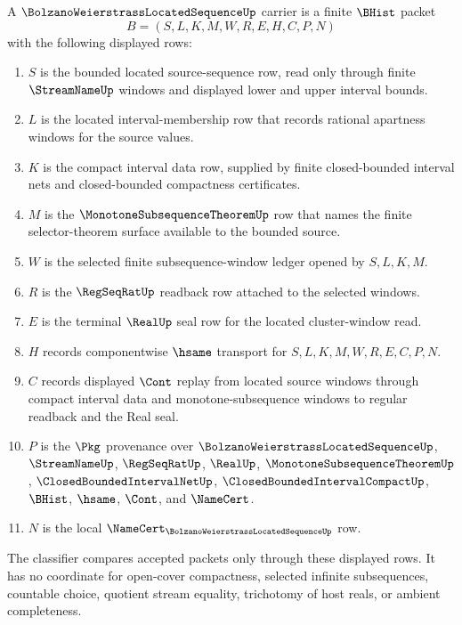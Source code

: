 \begin{definition}
\label{def:bolzano-weierstrass-located-sequence-carrier}
A $\BolzanoWeierstrassLocatedSequenceUp$ carrier is a finite $\BHist$ packet
$$
B=(S,L,K,M,W,R,E,H,C,P,N)
$$
with the following displayed rows:
\begin{enumerate}
\item $S$ is the bounded located source-sequence row, read only through finite $\StreamNameUp$ windows and displayed lower and upper interval bounds.
\item $L$ is the located interval-membership row that records rational apartness windows for the source values.
\item $K$ is the compact interval data row, supplied by finite closed-bounded interval nets and closed-bounded compactness certificates.
\item $M$ is the $\MonotoneSubsequenceTheoremUp$ row that names the finite selector-theorem surface available to the bounded source.
\item $W$ is the selected finite subsequence-window ledger opened by $S,L,K,M$.
\item $R$ is the $\RegSeqRatUp$ readback row attached to the selected windows.
\item $E$ is the terminal $\RealUp$ seal row for the located cluster-window read.
\item $H$ records componentwise $\hsame$ transport for $S,L,K,M,W,R,E,C,P,N$.
\item $C$ records displayed $\Cont$ replay from located source windows through compact interval data and monotone-subsequence windows to regular readback and the Real seal.
\item $P$ is the $\Pkg$ provenance over $\BolzanoWeierstrassLocatedSequenceUp$, $\StreamNameUp$, $\RegSeqRatUp$, $\RealUp$, $\MonotoneSubsequenceTheoremUp$, $\ClosedBoundedIntervalNetUp$, $\ClosedBoundedIntervalCompactUp$, $\BHist$, $\hsame$, $\Cont$, and $\NameCert$.
\item $N$ is the local $\NameCert_{\BolzanoWeierstrassLocatedSequenceUp}$ row.
\end{enumerate}
The classifier compares accepted packets only through these displayed rows. It has no coordinate for open-cover compactness, selected infinite subsequences, countable choice, quotient stream equality, trichotomy of host reals, or ambient completeness.
\end{definition}


